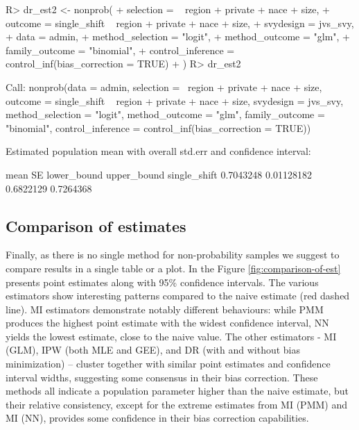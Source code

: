 \documentclass[
]{jss}
\begin{document}
\begin{CodeChunk}
\begin{CodeInput}
R> dr_est2 <- nonprob(
+   selection = ~ region + private + nace + size,
+   outcome = single_shift ~ region + private + nace + size,
+   svydesign = jvs_svy,
+   data = admin,
+   method_selection = "logit",
+   method_outcome = "glm",
+   family_outcome = "binomial",
+   control_inference = control_inf(bias_correction = TRUE)
+ )
R> dr_est2
\end{CodeInput}
\begin{CodeOutput}

Call:
nonprob(data = admin, selection = ~region + private + nace + 
    size, outcome = single_shift ~ region + private + nace + 
    size, svydesign = jvs_svy, method_selection = "logit", method_outcome = "glm", 
    family_outcome = "binomial", control_inference = control_inf(bias_correction = TRUE))

Estimated population mean with overall std.err and confidence interval:

                  mean         SE lower_bound upper_bound
single_shift 0.7043248 0.01128182   0.6822129   0.7264368
\end{CodeOutput}
\end{CodeChunk}

\subsection{Comparison of estimates}\label{comparison-of-estimates}

Finally, as there is no single method for non-probability samples we
suggest to compare results in a single table or a plot. In the Figure
\ref{fig:comparison-of-est} presents point estimates along with 95\%
confidence intervals. The various estimators show interesting patterns
compared to the naive estimate (red dashed line). MI estimators
demonstrate notably different behaviours: while PMM produces the highest
point estimate with the widest confidence interval, NN yields the lowest
estimate, close to the naive value. The other estimators - MI (GLM), IPW
(both MLE and GEE), and DR (with and without bias minimization) --
cluster together with similar point estimates and confidence interval
widths, suggesting some consensus in their bias correction. These
methods all indicate a population parameter higher than the naive
estimate, but their relative consistency, except for the extreme
estimates from MI (PMM) and MI (NN), provides some confidence in their
bias correction capabilities.
\end{document}
